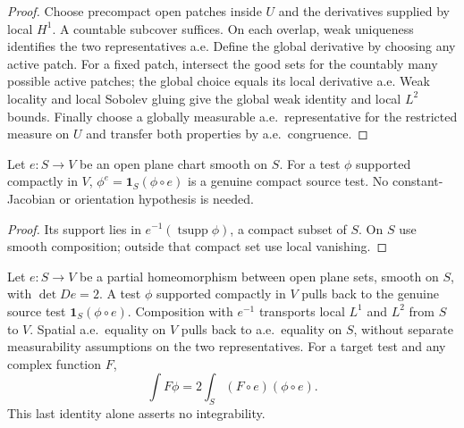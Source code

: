 \begin{proof}
\leanok
Choose precompact open patches inside $U$ and the derivatives supplied
by local $H^1$. A countable subcover suffices. On each overlap, weak
uniqueness identifies the two representatives a.e.
Define the global derivative by choosing any active patch. For a fixed
patch, intersect the good sets for the countably many possible active
patches; the global choice equals its local derivative a.e.
Weak locality and local Sobolev gluing give the global weak identity
and local $L^2$ bounds. Finally choose a globally measurable a.e.\
representative for the restricted measure on $U$ and transfer both
properties by a.e.\ congruence.
\end{proof}

\begin{lemma}
\label{lem:smooth-chart-test-pullback}
\leanok
Let $e:S\to V$ be an open plane chart smooth on $S$.
For a test $\phi$ supported compactly in $V$,
$\phi^e=\mathbf1_S(\phi\circ e)$ is a genuine compact source test.
No constant-Jacobian or orientation hypothesis is needed.
\end{lemma}

\begin{proof}
\leanok
Its support lies in $e^{-1}(\operatorname{tsupp}\phi)$, a compact subset of $S$.
On $S$ use smooth composition; outside that compact set use local vanishing.
\end{proof}

\begin{lemma}
\label{lem:smooth-chart-tests}
\leanok
Let $e:S\to V$ be a partial homeomorphism between open plane sets,
smooth on $S$, with $\det De=2$.
A test $\phi$ supported compactly in $V$ pulls back to the genuine
source test $\mathbf1_S(\phi\circ e)$.
Composition with $e^{-1}$ transports local $L^1$ and $L^2$ from $S$
to $V$. Spatial a.e.\ equality on $V$ pulls back to a.e.\ equality on $S$,
without separate measurability assumptions on the two representatives.
For a target test and any complex function $F$,
\[
 \int F\phi=2\int_S(F\circ e)(\phi\circ e).
\]
This last identity alone asserts no integrability.
\end{lemma}


